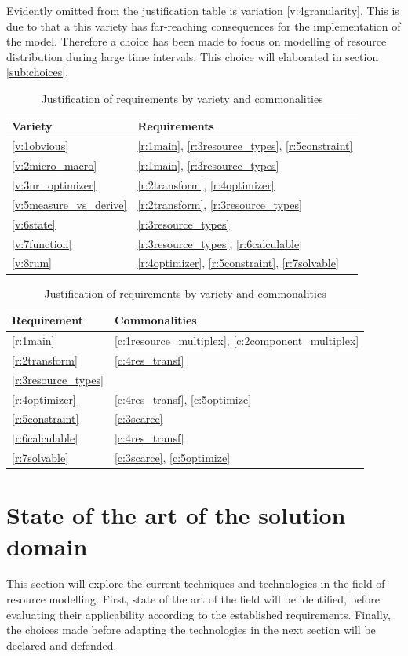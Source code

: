 Evidently omitted from the justification table is variation \ref{v:4granularity}. This is due to that a this variety has far-reaching consequences for the implementation of the model. Therefore a choice has been made to focus on modelling of resource distribution during large time intervals. This choice will elaborated in section \ref{sub:choices}.
\begin{table}
\centering
\begin{tabular}{|l|l|} \hline
Variety & Requirements \\ \hline
\ref{v:1obvious} & \ref{r:1main}, \ref{r:3resource_types}, \ref{r:5constraint}		\\ \hline
\ref{v:2micro_macro} & \ref{r:1main}, \ref{r:3resource_types} 	\\ \hline
\ref{v:3nr_optimizer} & \ref{r:2transform}, \ref{r:4optimizer} 	\\ \hline
\ref{v:5measure_vs_derive} & \ref{r:2transform}, \ref{r:3resource_types} \\ 	\hline
\ref{v:6state} & \ref{r:3resource_types} 	\\ \hline
\ref{v:7function} & \ref{r:3resource_types}, \ref{r:6calculable} 	\\ \hline
\ref{v:8rum} & \ref{r:4optimizer}, \ref{r:5constraint}, \ref{r:7solvable} 	\\ \hline
\end{tabular}
\hspace{24px}
\begin{tabular}{|l|l|} \hline
Requirement & Commonalities \\ \hline
\ref{r:1main} & \ref{c:1resource_multiplex}, \ref{c:2component_multiplex}	\\ \hline
\ref{r:2transform} & \ref{c:4res_transf}	\\ \hline
\ref{r:3resource_types} &	\\ \hline
\ref{r:4optimizer} & \ref{c:4res_transf}, \ref{c:5optimize} 	\\ \hline
\ref{r:5constraint} & \ref{c:3scarce}	\\ \hline
\ref{r:6calculable} & \ref{c:4res_transf}	\\ \hline
\ref{r:7solvable} & \ref{c:3scarce}, \ref{c:5optimize}	\\ \hline
\end{tabular}
\caption{Justification of requirements by variety and commonalities}
\label{table:justification}
\end{table}

\section{State of the art of the solution domain}
This section will explore the current techniques and technologies in the field of resource modelling. First, state of the art of the field will be identified, before evaluating their applicability according to the established requirements. Finally, the choices made before adapting the technologies in the next section will be declared and defended.

